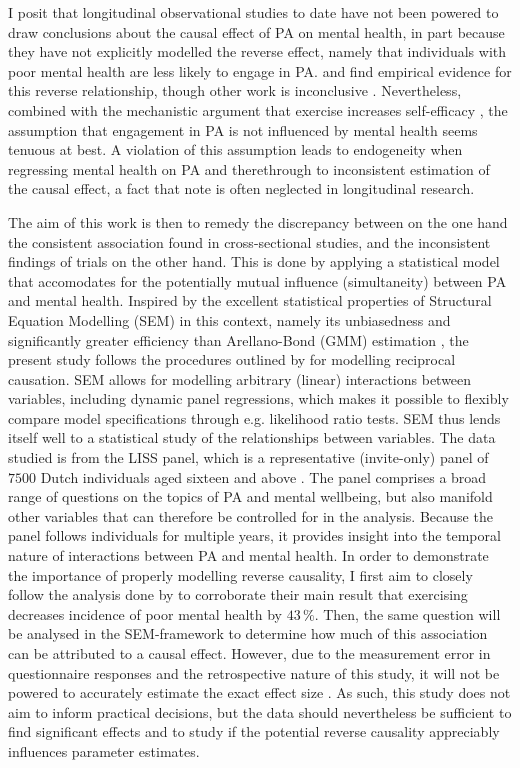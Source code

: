\documentclass[a4paper,11pt]{report}
\begin{document}
I posit that longitudinal observational studies to date have not been powered to draw conclusions about the causal effect
of PA on mental health, in part because they have not explicitly modelled the reverse effect, namely that individuals with poor
mental health are less likely to engage in PA.
 and  find empirical evidence for this reverse relationship,
though other work is inconclusive \cite{birkeland2009longitudinal, ku2012physical}. Nevertheless, combined with the
mechanistic argument that exercise increases self-efficacy \cite{smith2021role}, the assumption that engagement in PA is
not influenced by mental health seems tenuous at best.
A violation of this assumption leads to endogeneity when regressing mental health on PA and therethrough to
inconsistent estimation of the causal effect, a fact that  note is often neglected in
longitudinal research.

The aim of this work is then to remedy the discrepancy between on the one hand the consistent association found in
cross-sectional studies, and the inconsistent findings of trials on the other hand.
This is done by applying a statistical model that accomodates for the potentially mutual influence (simultaneity)
between PA and mental health. Inspired by the excellent statistical properties of Structural Equation Modelling (SEM)
in this context, namely its unbiasedness and significantly greater efficiency than Arellano-Bond (GMM) estimation
\cite{leszczensky2022deal}, the present study follows the procedures outlined by 
for modelling reciprocal causation.
SEM allows for modelling arbitrary (linear) interactions between variables, including dynamic panel regressions,
which makes it possible to flexibly compare model specifications through e.g. likelihood ratio tests.
SEM thus lends itself well to a statistical study of the relationships between variables.
The data studied is from the LISS panel, which is a representative (invite-only) panel of $7500$ Dutch individuals aged
sixteen and above \cite{scherpenzeel2010liss}. The panel comprises a broad range of questions on the topics of PA and
mental wellbeing, but also manifold other variables that can therefore be controlled for in the analysis.
Because the panel follows individuals for multiple years, it provides insight into the temporal nature of interactions
between PA and mental health.
In order to demonstrate the importance of properly modelling reverse causality, I first aim to closely follow
the analysis done by  to corroborate their main result that exercising decreases incidence
of poor mental health by $43\,\%$.
Then, the same question will be analysed in the SEM-framework to determine how much of this association can be attributed
to a causal effect. However, due to the measurement error in questionnaire responses and the retrospective nature of this study,
it will not be powered to accurately estimate the exact effect size \cite{pereira2014depressive}.
As such, this study does not aim to inform practical decisions, but the data should nevertheless be sufficient to find
significant effects and to study if the potential reverse causality appreciably influences parameter estimates.
\end{document}

